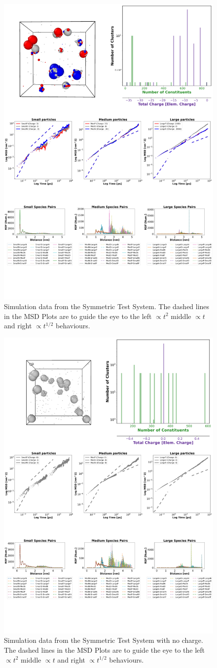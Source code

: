 \documentclass[a4paper,11pt,oneside]{book}
\begin{document}
\begin{figure}[!htbp]
\centering
\includegraphics[width=0.7\linewidth]{files/Fig4-58e6dad7889c9d6eaaa4abc74e3534eb.png}
\caption[]{Simulation data from the Symmetric Test System. The dashed lines in the MSD Plots are to guide the eye to the left $\propto t^2$ middle $\propto t$ and right $\propto t^{1/2}$ behaviours.}
\label{Fig4_SymTestSys}
\end{figure}

\begin{figure}[!htbp]
\centering
\includegraphics[width=0.7\linewidth]{files/Fig5-85672235d6e59a344ebdc8dfebe8a845.png}
\caption[]{Simulation data from the Symmetric Test System with no charge. The dashed lines in the MSD Plots are to guide the eye to the left $\propto t^2$ middle $\propto t$ and right $\propto t^{1/2}$ behaviours.}
\label{Fig5_NoQSymTestSys}
\end{figure}
\end{document}
